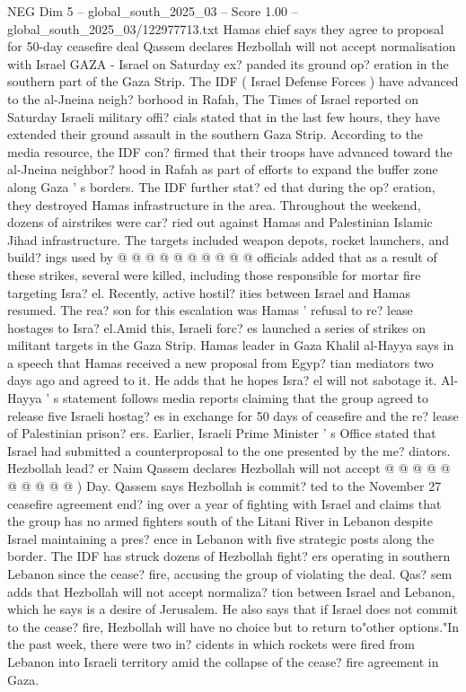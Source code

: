 \begin{textsample}{NEG Dim 5 – global\_south\_2025\_03 – Score 1.00 – global\_south\_2025\_03/122977713.txt}  \label{ex:f5_neg_277}
Hamas chief says they agree to proposal for 50-day ceasefire deal Qassem declares Hezbollah will not accept normalisation with Israel GAZA - Israel on Saturday ex? panded its ground op? eration in the southern part of the Gaza Strip.
The IDF ( Israel Defense Forces ) have advanced to the al-Jneina neigh? borhood in Rafah, The Times of Israel reported on Saturday Israeli military offi? cials stated that in the last few hours, they have extended their ground assault in the southern Gaza Strip.
According to the media resource, the IDF con? firmed that their troops have advanced toward the al-Jneina neighbor? hood in Rafah as part of efforts to expand the buffer zone along Gaza ' s borders.
The IDF further stat? ed that during the op? eration, they destroyed Hamas infrastructure in the area.
Throughout the weekend, dozens of airstrikes were car? ried out against Hamas and Palestinian Islamic Jihad infrastructure.
The targets included weapon depots, rocket launchers, and build? ings used by @ @ @ @ @ @ @ @ @ @ officials added that as a result of these strikes, several were killed, including those responsible for mortar fire targeting Isra? el.
Recently, active hostil? ities between Israel and Hamas resumed.
The rea? son for this escalation was Hamas ' refusal to re? lease hostages to Isra? el.Amid this, Israeli forc? es launched a series of strikes on militant targets in the Gaza Strip.
Hamas leader in Gaza Khalil al-Hayya says in a speech that Hamas received a new proposal from Egyp? tian mediators two days ago and agreed to it.
He adds that he hopes Isra? el will not sabotage it.
Al-Hayya ' s statement follows media reports claiming that the group agreed to release five Israeli hostag? es in exchange for 50 days of ceasefire and the re? lease of Palestinian prison? ers.
Earlier, Israeli Prime Minister ' s Office stated that Israel had submitted a counterproposal to the one presented by the me? diators.
Hezbollah lead? er Naim Qassem declares Hezbollah will not accept @ @ @ @ @ @ @ @ @ @ ) Day.
Qassem says Hezbollah is commit? ted to the November 27 ceasefire agreement end? ing over a year of fighting with Israel and claims that the group has no armed fighters south of the Litani River in Lebanon despite Israel maintaining a pres? ence in Lebanon with five strategic posts along the border.
The IDF has struck dozens of Hezbollah fight? ers operating in southern Lebanon since the cease? fire, accusing the group of violating the deal.
Qas? sem adds that Hezbollah will not accept normaliza? tion between Israel and Lebanon, which he says is a desire of Jerusalem.
He also says that if Israel does not commit to the cease? fire, Hezbollah will have no choice but to return to"other options."In the past week, there were two in? cidents in which rockets were fired from Lebanon into Israeli territory amid the collapse of the cease? fire agreement in Gaza.

\end{textsample}
